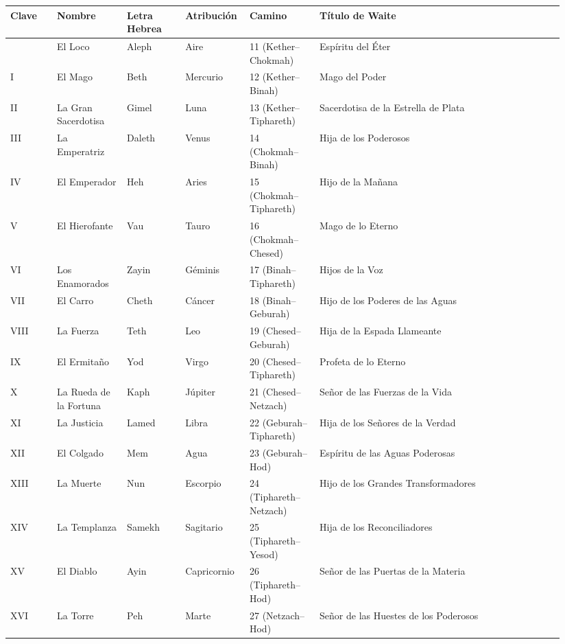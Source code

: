 \begin{longtable}[]{@{}>{\RaggedRight\small}p{0.08\linewidth}>{\RaggedRight\small}p{0.12\linewidth}>{\RaggedRight\small}p{0.10\linewidth}>{\RaggedRight\small}p{0.10\linewidth}>{\RaggedRight\small}p{0.12\linewidth}>{\RaggedRight\small}p{0.42\linewidth}@{}}
\toprule\noalign{}
Clave & Nombre & Letra Hebrea & Atribución & Camino & Título de Waite \\
\midrule\noalign{}
\endhead
\bottomrule\noalign{}
\endlastfoot
0 & El Loco & Aleph & Aire & 11 (Kether--Chokmah) & Espíritu del Éter \\
I & El Mago & Beth & Mercurio & 12 (Kether--Binah) & Mago del Poder \\
II & La Gran Sacerdotisa & Gimel & Luna & 13 (Kether--Tiphareth) & Sacerdotisa de la Estrella de Plata \\
III & La Emperatriz & Daleth & Venus & 14 (Chokmah--Binah) & Hija de los Poderosos \\
IV & El Emperador & Heh & Aries & 15 (Chokmah--Tiphareth) & Hijo de la Mañana \\
V & El Hierofante & Vau & Tauro & 16 (Chokmah--Chesed) & Mago de lo Eterno \\
VI & Los Enamorados & Zayin & Géminis & 17 (Binah--Tiphareth) & Hijos de la Voz \\
VII & El Carro & Cheth & Cáncer & 18 (Binah--Geburah) & Hijo de los Poderes de las Aguas \\
VIII & La Fuerza & Teth & Leo & 19 (Chesed--Geburah) & Hija de la Espada Llameante \\
IX & El Ermitaño & Yod & Virgo & 20 (Chesed--Tiphareth) & Profeta de lo Eterno \\
X & La Rueda de la Fortuna & Kaph & Júpiter & 21 (Chesed--Netzach) & Señor de las Fuerzas de la Vida \\
XI & La Justicia & Lamed & Libra & 22 (Geburah--Tiphareth) & Hija de los Señores de la Verdad \\
XII & El Colgado & Mem & Agua & 23 (Geburah--Hod) & Espíritu de las Aguas Poderosas \\
XIII & La Muerte & Nun & Escorpio & 24 (Tiphareth--Netzach) & Hijo de los Grandes Transformadores \\
XIV & La Templanza & Samekh & Sagitario & 25 (Tiphareth--Yesod) & Hija de los Reconciliadores \\
XV & El Diablo & Ayin & Capricornio & 26 (Tiphareth--Hod) & Señor de las Puertas de la Materia \\
XVI & La Torre & Peh & Marte & 27 (Netzach--Hod) & Señor de las Huestes de los Poderosos \\

\end{longtable}
